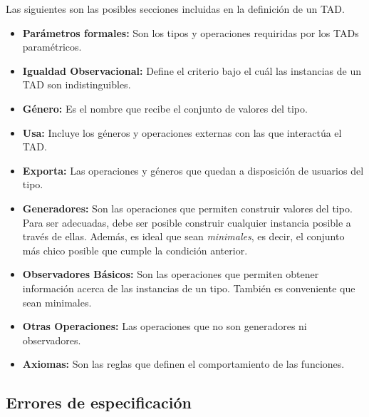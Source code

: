 \documentclass{article}
\begin{document}
Las siguientes son las posibles secciones incluidas en la definición de un TAD.
\begin{itemize}
    \item \textbf{Parámetros formales:} Son los tipos y operaciones requiridas por los TADs paramétricos.
    \item \textbf{Igualdad Observacional:} Define el criterio bajo el cuál las instancias de un TAD son indistinguibles.
    \item \textbf{Género:} Es el nombre que recibe el conjunto de valores del tipo.
    \item \textbf{Usa:} Incluye los géneros y operaciones externas con las que interactúa el TAD.
    \item \textbf{Exporta:} Las operaciones y géneros que quedan a disposición de usuarios del tipo.
    \item \textbf{Generadores:} Son las operaciones que permiten construir valores del tipo. Para ser adecuadas, debe ser posible construir cualquier instancia posible a través de ellas. Además, es ideal que sean \textit{minimales}, es decir, el conjunto más chico posible que cumple la condición anterior.
    \item \textbf{Observadores Básicos:} Son las operaciones que permiten obtener información acerca de las instancias de un tipo. También es conveniente que sean minimales.
    \item \textbf{Otras Operaciones:} Las operaciones que no son generadores ni observadores.
    \item \textbf{Axiomas:} Son las reglas que definen el comportamiento de las funciones.
\end{itemize}

\subsection{Errores de especificación}
\end{document}
